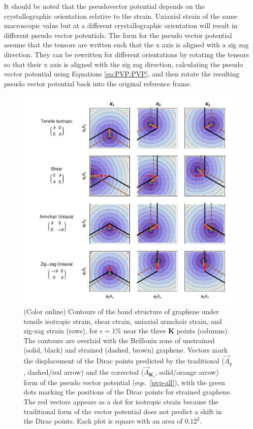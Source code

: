 It should be noted that the pseudovector potential depends on the crystallographic orientation relative to the strain.
Uniaxial strain of the same macroscopic value but at a different crystallographic orientation will result in different pseudo vector potentials.
The form for the pseudo vector potential assume that the tensors are written such that the x axis is aligned with a zig zag direction.
They can be rewritten for different orientations by rotating the tensors so that their x axis is aligned with the zig zag direction, calculating the pseudo vector potential using Equations \ref{eq:PVP:PVP}, and then rotate the resulting pseudo vector potential back into the original reference frame.

\begin{figure}
\includegraphics{Figs_PVP/figure_2.pdf}
\caption{(Color online) Contours of the band structure of graphene under tensile isotropic strain, shear strain, uniaxial armchair strain, and zig-zag strain (rows), for $\epsilon=1\%$ near the three $\bm{K}$ points (columns). The contours are overlaid with the Brillouin zone of unstrained (solid, black)  and strained (dashed, brown) graphene. Vectors mark the displacement of the Dirac points predicted by the traditional ($\vec{A}_p$, dashed/red arrow) and the corrected ($\vec{A}_{\bm{K}_{\!i}}$, solid/orange arrow) form of the pseudo vector potential (eqs.~\ref{pvp-all}), with the green dots marking the positions of the Dirac points for strained graphene. The red vectors appears as a dot for isotropic strain because the traditional form of the vector potential does not predict a shift in the Dirac points.  Each plot is square with an area of $0.12^2$. \label{fig:PVP:PVPshifts}}
\end{figure}


